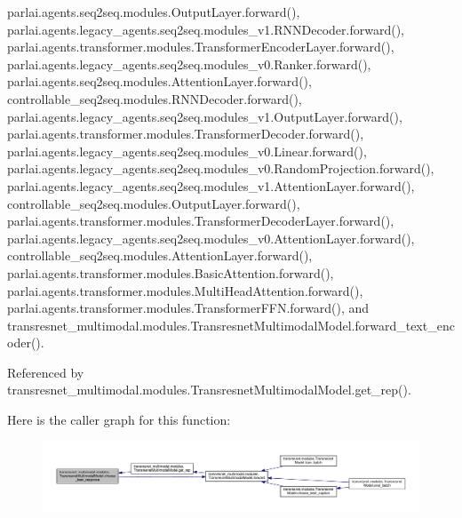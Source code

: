 parlai.\+agents.\+seq2seq.\+modules.\+Output\+Layer.\+forward(), parlai.\+agents.\+legacy\+\_\+agents.\+seq2seq.\+modules\+\_\+v1.\+R\+N\+N\+Decoder.\+forward(), parlai.\+agents.\+transformer.\+modules.\+Transformer\+Encoder\+Layer.\+forward(), parlai.\+agents.\+legacy\+\_\+agents.\+seq2seq.\+modules\+\_\+v0.\+Ranker.\+forward(), parlai.\+agents.\+seq2seq.\+modules.\+Attention\+Layer.\+forward(), controllable\+\_\+seq2seq.\+modules.\+R\+N\+N\+Decoder.\+forward(), parlai.\+agents.\+legacy\+\_\+agents.\+seq2seq.\+modules\+\_\+v1.\+Output\+Layer.\+forward(), parlai.\+agents.\+transformer.\+modules.\+Transformer\+Decoder.\+forward(), parlai.\+agents.\+legacy\+\_\+agents.\+seq2seq.\+modules\+\_\+v0.\+Linear.\+forward(), parlai.\+agents.\+legacy\+\_\+agents.\+seq2seq.\+modules\+\_\+v0.\+Random\+Projection.\+forward(), parlai.\+agents.\+legacy\+\_\+agents.\+seq2seq.\+modules\+\_\+v1.\+Attention\+Layer.\+forward(), controllable\+\_\+seq2seq.\+modules.\+Output\+Layer.\+forward(), parlai.\+agents.\+transformer.\+modules.\+Transformer\+Decoder\+Layer.\+forward(), parlai.\+agents.\+legacy\+\_\+agents.\+seq2seq.\+modules\+\_\+v0.\+Attention\+Layer.\+forward(), controllable\+\_\+seq2seq.\+modules.\+Attention\+Layer.\+forward(), parlai.\+agents.\+transformer.\+modules.\+Basic\+Attention.\+forward(), parlai.\+agents.\+transformer.\+modules.\+Multi\+Head\+Attention.\+forward(), parlai.\+agents.\+transformer.\+modules.\+Transformer\+F\+F\+N.\+forward(), and transresnet\+\_\+multimodal.\+modules.\+Transresnet\+Multimodal\+Model.\+forward\+\_\+text\+\_\+encoder().



Referenced by transresnet\+\_\+multimodal.\+modules.\+Transresnet\+Multimodal\+Model.\+get\+\_\+rep().

Here is the caller graph for this function\+:
\nopagebreak
\begin{figure}[H]
\begin{center}
\leavevmode
\includegraphics[width=350pt]{classtransresnet__multimodal_1_1modules_1_1TransresnetMultimodalModel_ad1ba23a860f8af75c97510ae52622748_icgraph}
\end{center}
\end{figure}
\mbox{\label{classtransresnet__multimodal_1_1modules_1_1TransresnetMultimodalModel_a8d2154a0d338144c48e049ebe76b9727}} 
